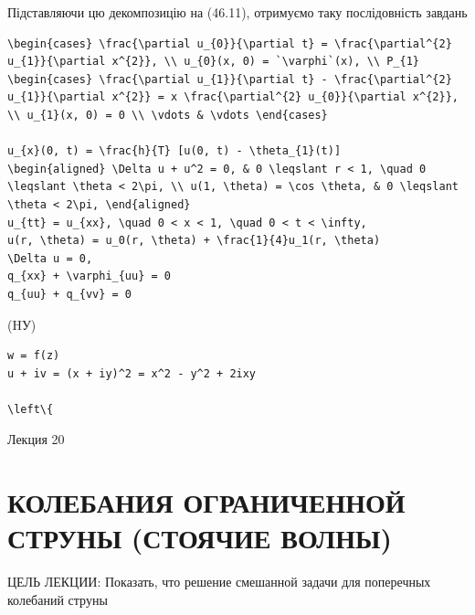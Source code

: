 \documentclass[
  ukrainian,
]{article}
\begin{document}
Підставляючи цю декомпозицію на (46.11), отримуємо таку послідовність
завдань

\begin{verbatim}
\begin{cases} \frac{\partial u_{0}}{\partial t} = \frac{\partial^{2} u_{1}}{\partial x^{2}}, \\ u_{0}(x, 0) = `\varphi`(x), \\ P_{1} \begin{cases} \frac{\partial u_{1}}{\partial t} - \frac{\partial^{2} u_{1}}{\partial x^{2}} = x \frac{\partial^{2} u_{0}}{\partial x^{2}}, \\ u_{1}(x, 0) = 0 \\ \vdots & \vdots \end{cases}

u_{x}(0, t) = \frac{h}{T} [u(0, t) - \theta_{1}(t)]
\begin{aligned} \Delta u + u^2 = 0, & 0 \leqslant r < 1, \quad 0 \leqslant \theta < 2\pi, \\ u(1, \theta) = \cos \theta, & 0 \leqslant \theta < 2\pi, \end{aligned}
u_{tt} = u_{xx}, \quad 0 < x < 1, \quad 0 < t < \infty,
u(r, \theta) = u_0(r, \theta) + \frac{1}{4}u_1(r, \theta)
\Delta u = 0,
q_{xx} + \varphi_{uu} = 0
q_{uu} + q_{vv} = 0
\end{verbatim}

(HУ)

\begin{verbatim}
w = f(z)
u + iv = (x + iy)^2 = x^2 - y^2 + 2ixy

\left\{
\end{verbatim}

Лекция 20

\section{КОЛЕБАНИЯ ОГРАНИЧЕННОЙ СТРУНЫ (СТОЯЧИЕ
ВОЛНЫ)}\label{ux43aux43eux43bux435ux431ux430ux43dux438ux44f-ux43eux433ux440ux430ux43dux438ux447ux435ux43dux43dux43eux439-ux441ux442ux440ux443ux43dux44b-ux441ux442ux43eux44fux447ux438ux435-ux432ux43eux43bux43dux44b}

ЦЕЛЬ ЛЕКЦИИ: Показать, что решение смешанной задачи для поперечных
колебаний струны
\end{document}
